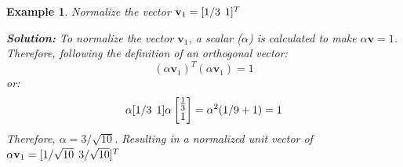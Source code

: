 \documentclass[12pt,letter]{article}
\newtheorem{ex}{Example}
\numberwithin{ex}{section} %
\newenvironment{example}{\begin{mdframed}[middlelinewidth=0.5mm]\begin{ex}\normalfont}{\end{ex}\end{mdframed}}
\numberwithin{re}{section} %
\begin{document}
\begin{example}
\label{ex:vector_normalizeation}
Normalize the vector $\textbf{v}_1=[1/3 \hspace{1ex} 1]^T$

\textbf{Solution:} To normalize the vector $\textbf{v}_1$, a scalar ($\alpha$) is calculated to make $\alpha\textbf{v}=1$.  Therefore, following the definition of an orthogonal vector:
\begin{equation}
(\alpha \textbf{v}_1)^T(\alpha \textbf{v}_1) = 1
\end{equation}
or:
\begin{equation}
\alpha [1/3 \hspace{1ex} 1]\alpha  \begin{bmatrix} \frac{1}{3}\\  1 \end{bmatrix}  = \alpha^2(1/9+1) = 1
\end{equation}
Therefore, $\alpha=3/\sqrt{10}$. Resulting in a normalized unit vector of $\alpha\textbf{v}_1=[1/\sqrt{10} \hspace{1ex} 3/\sqrt{10}]^T$

\end{example}
\end{document}
